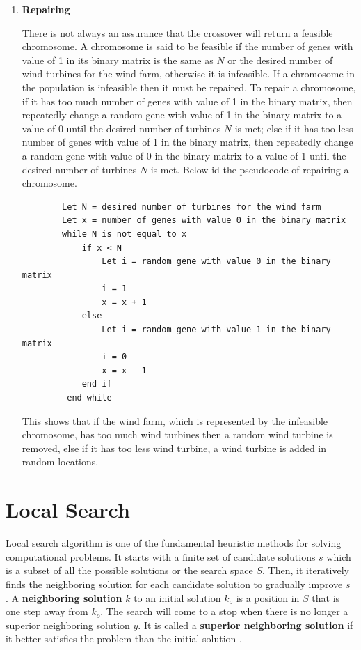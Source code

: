 \begin{enumerate}
                \item \textbf{Repairing}
                    \par There is not always an assurance that the crossover will return a feasible chromosome. A chromosome is said to be feasible if the number of genes with value of 1 in its binary matrix is the same as $N$ or the desired number of wind turbines for the wind farm, otherwise it is infeasible. If a chromosome in the population is infeasible then it must be repaired. To repair a chromosome, if it has too much number of genes with value of 1 in the binary matrix, then repeatedly change a random gene with value of 1 in the binary matrix to a value of 0 until the desired number of turbines $N$ is met; else if it has too less number of genes with value of 1 in the binary matrix, then repeatedly change a random gene with value of 0 in the binary matrix to a value of 1 until the desired number of turbines $N$ is met. Below id the pseudocode of repairing a chromosome.
                   
        \singlespacing 
        \begin{lstlisting}
        Let N = desired number of turbines for the wind farm
        Let x = number of genes with value 0 in the binary matrix
        while N is not equal to x
            if x < N
                Let i = random gene with value 0 in the binary matrix
                i = 1
                x = x + 1
            else
                Let i = random gene with value 1 in the binary matrix
                i = 0
                x = x - 1
            end if
         end while
        \end{lstlisting}
        \doublespacing
                    
                    This shows that if the wind farm, which is represented by the infeasible chromosome, has too much wind turbines then a random wind turbine is removed, else if it has too less wind turbine, a wind turbine is added in random locations.
            \end{enumerate}
            
        \section{Local Search}
            \par Local search algorithm is one of the fundamental heuristic methods for solving computational problems. It starts with a finite set of candidate solutions $s$ which is a subset of all the possible solutions or the search space $S$. Then, it iteratively finds the neighboring solution for each candidate solution to gradually improve $s$ \cite{localsearch1}. A \textbf{neighboring solution} $k$ to an initial solution $k_o$ is a position in $S$ that is one step away from $k_o$. The search will come to a stop when there is no longer a superior neighboring solution $y$. It is called a \textbf{superior neighboring solution} if it better satisfies the problem than the initial solution \cite{localsearch2}.
            
